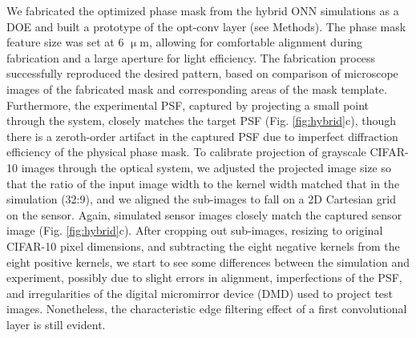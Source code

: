 \documentclass[fleqn,10pt]{wlscirep}
\begin{document}
We fabricated the optimized phase mask from the hybrid ONN simulations as a DOE and built a prototype of the opt-conv layer (see Methods). The phase mask feature size was set at 6 $\upmu$m, allowing for comfortable alignment during fabrication and a large aperture for light efficiency. The fabrication process successfully reproduced the desired pattern, based on comparison of microscope images of the fabricated mask and corresponding areas of the mask template. Furthermore, the experimental PSF, captured by projecting a small point through the system, closely matches the target PSF (Fig. \ref{fig:hybrid}c), though there is a zeroth-order artifact in the captured PSF due to imperfect diffraction efficiency of the physical phase mask. To calibrate projection of grayscale CIFAR-10 images through the optical system, we adjusted the projected image size so that the ratio of the input image width to the kernel width matched that in the simulation (32:9), and we aligned the sub-images to fall on a 2D Cartesian grid on the sensor. Again, simulated sensor images closely match the captured sensor image (Fig. \ref{fig:hybrid}c). After cropping out sub-images, resizing to original CIFAR-10 pixel dimensions, and subtracting the eight negative kernels from the eight positive kernels, we start to see some differences between the simulation and experiment, possibly due to slight errors in alignment, imperfections of the PSF, and irregularities of the digital micromirror device (DMD) used to project test images. Nonetheless, the characteristic edge filtering effect of a first convolutional layer is still evident. 
\end{document}
